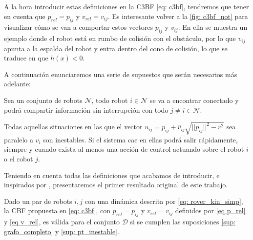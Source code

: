 A la hora introducir estas definiciones en la C3BF \eqref{eq: c3bf}, tendremos que tener en cuenta que $p_{rel} = p_{ij}$ y $v_{rel} = v_{ij}$. Es interesante volver a la \autoref{fig: c3bf_not} para visualizar cómo se van a comportar estos vectores $p_{ij}$ y $v_{ij}$. En ella se muestra un ejemplo donde el robot está en rumbo de colisión con el obstáculo, por lo que $v_{ij}$ apunta a la espalda del robot y entra dentro del cono de colisión, lo que se traduce en que $h(x) < 0$.

A continuación enunciaremos una serie de supuestos que serán necesarios más adelante:

\begin{suposicion} \label{sup: grafo_completo}
    Sea un conjunto de robots $\mathcal{N}$, todo robot $i \in \mathcal{N}$ se va a encontrar conectado y podrá compartir información sin interrupción con todo $j \neq i \in \mathcal{N}$.
\end{suposicion}

\vspace{0.2cm}

\begin{suposicion} \label{sup: pt_inestable} %
    Todas aquellas situaciones en las que el vector $u_{ij} = p_{ij} + \hat v_{ij} \sqrt{||p_{ij}||^2 - r^2}$ sea paralelo a $v_i$ son inestables. Si el sistema cae en ellas podrá salir rápidamente, siempre y cuando exista al menos una acción de control actuando sobre el robot $i$ o el robot $j$. 
\end{suposicion}

Teniendo en cuenta todas las definiciones que acabamos de introducir, e inspirados por \cite[Teorema 1]{c3bf_car}, presentaremos el primer resultado original de este trabajo.

\begin{thm} \label{thm: cbf}
    Dado un par de robots $i,j$ con una dinámica descrita por \eqref{eq: rover_kin_simp}, la CBF propuesta en \eqref{eq: c3bf}, con $p_{rel} = p_{ij}$ y $v_{rel} = v_{ij}$ definidos por \eqref{eq p_rel} y \eqref{eq v_rel}, es válida para el conjunto $\mathcal{D}$ si se cumplen las suposiciones \ref{sup: grafo_completo} y \ref{sup: pt_inestable}.
\end{thm}

